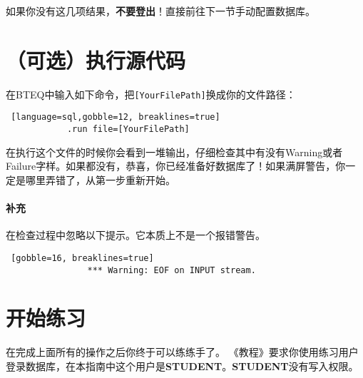 \documentclass{article}
\begin{document}

		
		如果你没有这几项结果，\textbf{不要登出}！直接前往下一节手动配置数据库。

		

	\section{（可选）执行源代码} %
		
		 \par

		\bigskip
	



		在BTEQ中输入如下命令，把\lstinline|[YourFilePath]|换成你的文件路径：

		\begin{lstlisting} [language=sql,gobble=12, breaklines=true]
			.run file=[YourFilePath]
		\end{lstlisting}

		在执行这个文件的时候你会看到一堆输出，仔细检查其中有没有Warning或者Failure字样。如果都没有，恭喜，你已经准备好数据库了！如果满屏警告，你一定是哪里弄错了，从第一步重新开始。

		\paragraph{补充}
			在检查过程中忽略以下提示。它本质上不是一个报错警告。

			\begin{lstlisting} [gobble=16, breaklines=true]
				*** Warning: EOF on INPUT stream.
			\end{lstlisting}


	\section{开始练习} %
		在完成上面所有的操作之后你终于可以练练手了。
		 《教程》要求你使用练习用户登录数据库，在本指南中这个用户是\textbf{STUDENT}。\textbf{STUDENT}没有写入权限。
\end{document}
